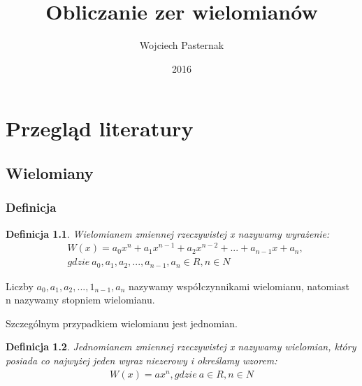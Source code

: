 \documentclass[twoside,a4paper]{book}
\title{Obliczanie zer wielomianów}
\author{Wojciech Pasternak}
\date{2016}
\newtheorem{definition}{Definicja}
\begin{document}
\frontmatter
\maketitle
\tableofcontents

\mainmatter

\chapter{Przegląd literatury}
\section{Wielomiany}
\subsection{Definicja}

\begin{definition}
	Wielomianem zmiennej rzeczywistej x nazywamy wyrażenie:
	\begin{equation}
		\begin{split}
			&W(x) = a_0x^n + a_1x^{n-1} + a_2x^{n-2}+ ... + a_{n-1}x + a_n, \\
			&gdzie\ a_0, a_1, a_2, ..., a_{n-1}, a_n\in R, n \in N 
		\end{split}
	\end{equation}
\end{definition}

Liczby $a_0, a_1, a_2, ..., 1_{n-1}, a_n$ nazywamy współczynnikami wielomianu, natomiast n nazywamy stopniem wielomianu.
	
Szczególnym przypadkiem wielomianu jest jednomian. 

\begin{definition}
	Jednomianem zmiennej rzeczywistej x nazywamy wielomian, który posiada co najwyżej jeden wyraz niezerowy i określamy wzorem:
	\begin{equation}
		\begin{split}
			W(x) = ax^n, gdzie\ a\in R, n \in N 
		\end{split}
	\end{equation}
\end{definition}
\end{document}
